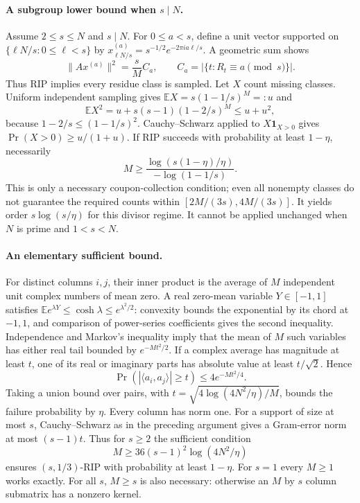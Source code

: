 \documentclass[11pt]{article}
\begin{document}
\paragraph{A subgroup lower bound when $s\mid N$.}
Assume $2\le s\le N$ and $s\mid N$. For $0\le a<s$, define a unit vector
supported on $\{\ell N/s:0\le\ell<s\}$ by
$x^{(a)}_{\ell N/s}=s^{-1/2}e^{-2\pi i a\ell/s}$.
A geometric sum shows
\[
\|Ax^{(a)}\|^2=\frac sM C_a,
\qquad C_a=|\{t:R_t\equiv a\pmod s\}|.
\]
Thus RIP implies every residue class is sampled. Let $X$ count missing
classes. Uniform independent sampling gives
$\mathbb EX=s(1-1/s)^M=:u$ and
\[
\mathbb EX^2=u+s(s-1)(1-2/s)^M\le u+u^2,
\]
because $1-2/s\le(1-1/s)^2$. Cauchy--Schwarz applied to
$X\boldsymbol1_{X>0}$ gives $\Pr(X>0)\ge u/(1+u)$.
If RIP succeeds with probability at least $1-\eta$, necessarily
\[
M\ge\frac{\log(s(1-\eta)/\eta)}{-\log(1-1/s)}.
\]
This is only a necessary coupon-collection condition; even all nonempty
classes do not guarantee the required counts within $[2M/(3s),4M/(3s)]$.
It yields order $s\log(s/\eta)$ for this divisor regime. It cannot be applied
unchanged when $N$ is prime and $1<s<N$.

\paragraph{An elementary sufficient bound.}
For distinct columns $i,j$, their inner product is the average of $M$
independent unit complex numbers of mean zero. A real zero-mean variable
$Y\in[-1,1]$ satisfies $\mathbb E e^{\lambda Y}\le\cosh\lambda
\le e^{\lambda^2/2}$: convexity bounds the exponential by its chord at
$-1,1$, and comparison of power-series coefficients gives the second inequality.
Independence and Markov's inequality imply that the mean of $M$ such variables
has either real tail bounded by $e^{-Mt^2/2}$. If a complex average has
magnitude at least $t$, one of its real or imaginary parts has absolute value
at least $t/\sqrt2$. Hence
\[
\Pr(|\langle a_i,a_j\rangle|\ge t)\le4e^{-Mt^2/4}.
\]
Taking a union bound over pairs, with
$t=\sqrt{4\log(4N^2/\eta)/M}$, bounds the failure probability by $\eta$.
Every column has norm one. For a support of size at most $s$, Cauchy--Schwarz
as in the preceding argument gives a Gram-error norm at most $(s-1)t$.
Thus for $s\ge2$ the sufficient condition
\[
M\ge36(s-1)^2\log(4N^2/\eta)
\]
ensures $(s,1/3)$-RIP with probability at least $1-\eta$.
For $s=1$ every $M\ge1$ works exactly. For all $s$, $M\ge s$ is also
necessary: otherwise an $M$ by $s$ column submatrix has a nonzero kernel.
\end{document}
